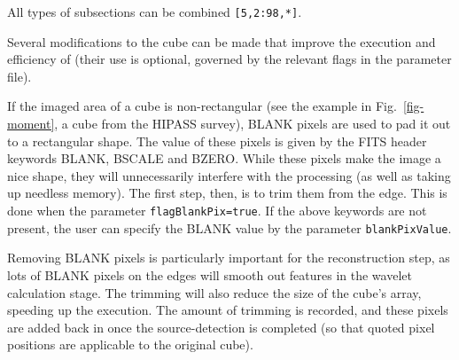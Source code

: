 All types of subsections can be combined \eg \texttt{[5,2:98,*]}.


%
%

\label{sec-modify}

Several modifications to the cube can be made that improve the
execution and efficiency of \duchamp (their use is optional, governed
by the relevant flags in the parameter file).


If the imaged area of a cube is non-rectangular (see the example in
Fig.~\ref{fig-moment}, a cube from the HIPASS survey), BLANK pixels are
used to pad it out to a rectangular shape. The value of these pixels
is given by the FITS header keywords BLANK, BSCALE and BZERO. While
these pixels make the image a nice shape, they will unnecessarily
interfere with the processing (as well as taking up needless
memory). The first step, then, is to trim them from the edge. This is
done when the parameter \texttt{flagBlankPix=true}. If the above
keywords are not present, the user can specify the BLANK value by the
parameter \texttt{blankPixValue}.

Removing BLANK pixels is particularly important for the reconstruction
step, as lots of BLANK pixels on the edges will smooth out features in
the wavelet calculation stage. The trimming will also reduce the size
of the cube's array, speeding up the execution. The amount of trimming
is recorded, and these pixels are added back in once the
source-detection is completed (so that quoted pixel positions are
applicable to the original cube).

